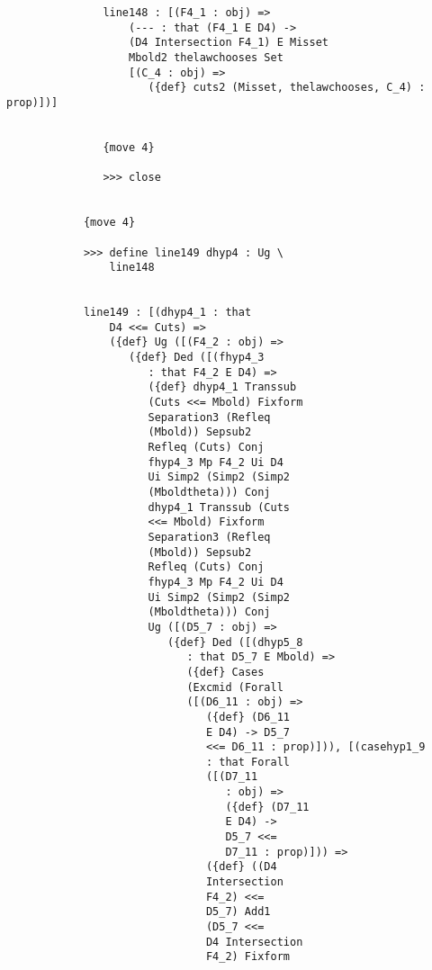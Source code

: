 \documentclass[12pt]{article}
\begin{document}
\begin{verbatim}
               line148 : [(F4_1 : obj) => 
                   (--- : that (F4_1 E D4) -> 
                   (D4 Intersection F4_1) E Misset 
                   Mbold2 thelawchooses Set 
                   [(C_4 : obj) => 
                      ({def} cuts2 (Misset, thelawchooses, C_4) : prop)])]


               {move 4}

               >>> close


            {move 4}

            >>> define line149 dhyp4 : Ug \
                line148


            line149 : [(dhyp4_1 : that 
                D4 <<= Cuts) => 
                ({def} Ug ([(F4_2 : obj) => 
                   ({def} Ded ([(fhyp4_3 
                      : that F4_2 E D4) => 
                      ({def} dhyp4_1 Transsub 
                      (Cuts <<= Mbold) Fixform 
                      Separation3 (Refleq 
                      (Mbold)) Sepsub2 
                      Refleq (Cuts) Conj 
                      fhyp4_3 Mp F4_2 Ui D4 
                      Ui Simp2 (Simp2 (Simp2 
                      (Mboldtheta))) Conj 
                      dhyp4_1 Transsub (Cuts 
                      <<= Mbold) Fixform 
                      Separation3 (Refleq 
                      (Mbold)) Sepsub2 
                      Refleq (Cuts) Conj 
                      fhyp4_3 Mp F4_2 Ui D4 
                      Ui Simp2 (Simp2 (Simp2 
                      (Mboldtheta))) Conj 
                      Ug ([(D5_7 : obj) => 
                         ({def} Ded ([(dhyp5_8 
                            : that D5_7 E Mbold) => 
                            ({def} Cases 
                            (Excmid (Forall 
                            ([(D6_11 : obj) => 
                               ({def} (D6_11 
                               E D4) -> D5_7 
                               <<= D6_11 : prop)])), [(casehyp1_9 
                               : that Forall 
                               ([(D7_11 
                                  : obj) => 
                                  ({def} (D7_11 
                                  E D4) -> 
                                  D5_7 <<= 
                                  D7_11 : prop)])) => 
                               ({def} ((D4 
                               Intersection 
                               F4_2) <<= 
                               D5_7) Add1 
                               (D5_7 <<= 
                               D4 Intersection 
                               F4_2) Fixform 

\end{verbatim}
\end{document}
